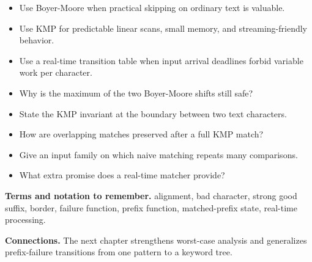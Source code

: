 \documentclass[11pt]{article}
\begin{document}
\begin{tcolorbox}[enhanced,breakable,title={Algorithm selection / when to use this},
  colback=Primary!3,colframe=Primary,fonttitle=\small\sffamily\bfseries,fontupper=\footnotesize,
  boxsep=0.6mm,left=1.5mm,right=1.5mm,top=1mm,bottom=1mm,before skip=3pt,after skip=3pt]
\begin{itemize}
  \item Use Boyer-Moore when practical skipping on ordinary text is valuable.
  \item Use KMP for predictable linear scans, small memory, and streaming-friendly behavior.
  \item Use a real-time transition table when input arrival deadlines forbid variable work per character.
\end{itemize}
\end{tcolorbox}

\begin{tcolorbox}[enhanced,breakable,title={Self-test questions},
  colback=white,colframe=Accent,fonttitle=\small\sffamily\bfseries,fontupper=\footnotesize,
  boxsep=0.6mm,left=1.5mm,right=1.5mm,top=1mm,bottom=1mm,before skip=3pt,after skip=3pt]
\begin{itemize}
  \item Why is the maximum of the two Boyer-Moore shifts still safe?
  \item State the KMP invariant at the boundary between two text characters.
  \item How are overlapping matches preserved after a full KMP match?
  \item Give an input family on which naive matching repeats many comparisons.
  \item What extra promise does a real-time matcher provide?
\end{itemize}
\end{tcolorbox}

{\footnotesize
\textbf{Terms and notation to remember.} alignment, bad character, strong good suffix, border, failure function, prefix function, matched-prefix state, real-time processing.

\textbf{Connections.} The next chapter strengthens worst-case analysis and generalizes prefix-failure transitions from one pattern to a keyword tree.
}
\end{document}
